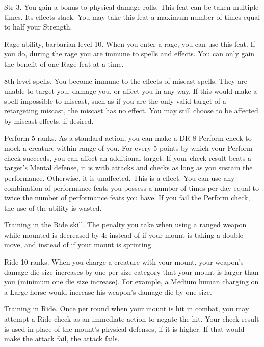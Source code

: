 \featpres Str 3.
\featben You gain a  bonus to physical damage rolls.
 This feat can be taken multiple times. Its effects stack.
You may take this feat a maximum number of times equal to half your Strength.

\featpres Rage ability, barbarian level 10.
\featben When you enter a rage, you can use this feat. If you do, during the rage you are immune to  spells and effects.
 You can only gain the benefit of one Rage feat at a time.

\featpre 8th level spells.
\featben You become immune to the effects of miscast spells.
They are unable to target you, damage you, or affect you in any way.
If this would make a spell impossible to miscast, such as if you are the only valid target of a retargeting miscast, the miscast has no effect.
You may still choose to be affected by miscast effects, if desired.

\featpre Perform 5 ranks.
\featben As a standard action, you can make a DR 8 Perform check to mock a creature within \rngmed range of you.
For every 5 points by which your Perform check succeeds, you can affect an additional target.
If your check result beats a target's Mental defense, it is \impaired with attacks and checks as long as you sustain the performance.
Otherwise, it is unaffected.
This is a  effect.
You can use any combination of performance feats you possess a number of times per day equal to twice the number of performance feats you have.
If you fail the Perform check, the use of the ability is wasted.

\featpre Training in the Ride skill.
\featben The penalty you take when using a ranged weapon while mounted is decreased by 4:  instead of  if your mount is taking a double move, and  instead of  if your mount is sprinting.

\featpre Ride 10 ranks.
\featben When you charge a creature with your mount, your weapon's damage die size increases by one per size category that your mount is larger than you (minimum one die size increase).
For example, a Medium human charging on a Large horse would increase his weapon's damage die by one size.

\featpre Training in Ride.
\featben Once per round when your mount is hit in combat, you may attempt a Ride check as an immediate action to negate the hit.
Your check result is used in place of the mount's physical defenses, if it is higher.
If that would make the attack fail, the attack fails.


